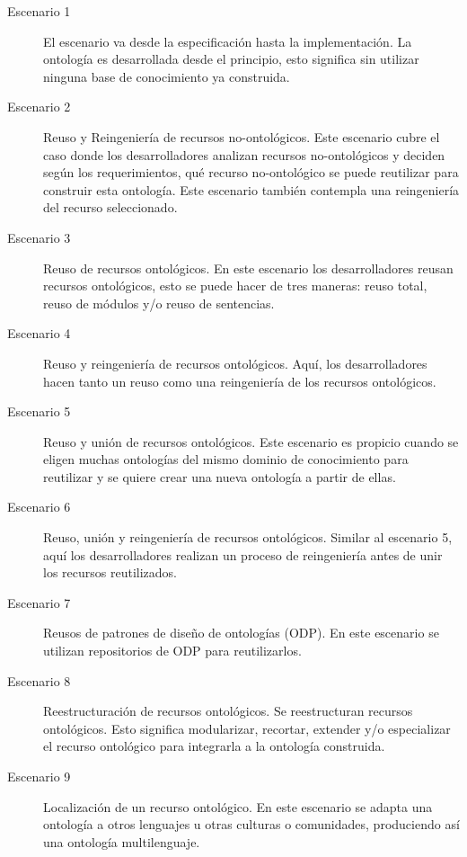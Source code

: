 \begin{description}
    \item[Escenario 1] El escenario va desde la especificación hasta la implementación. La ontología es desarrollada desde el principio, esto significa sin utilizar ninguna base de conocimiento ya construida.
    \item[Escenario 2] Reuso y Reingeniería de recursos no-ontológicos. Este escenario cubre el caso donde los desarrolladores analizan recursos no-ontológicos y deciden según los requerimientos, qué recurso no-ontológico se puede reutilizar para construir esta ontología. Este escenario también contempla una reingeniería del recurso seleccionado.
    \item[Escenario 3] Reuso de recursos ontológicos. En este escenario los desarrolladores reusan recursos ontológicos, esto se puede hacer de tres maneras: reuso total, reuso de módulos y/o reuso de sentencias.
    \item[Escenario 4] Reuso y reingeniería de recursos ontológicos. Aquí, los desarrolladores hacen tanto un reuso como una reingeniería de los recursos ontológicos.
    \item[Escenario 5] Reuso y unión de recursos ontológicos. Este escenario es propicio cuando se eligen muchas ontologías del mismo dominio de conocimiento para reutilizar y se quiere crear una nueva ontología a partir de ellas.
    \item[Escenario 6] Reuso, unión y reingeniería de recursos ontológicos. Similar al escenario 5, aquí los desarrolladores realizan un proceso de reingeniería antes de unir los recursos reutilizados.
    \item[Escenario 7] Reusos de patrones de diseño de ontologías (ODP). En este escenario se utilizan repositorios de ODP para reutilizarlos.
    \item[Escenario 8] Reestructuración de recursos ontológicos. Se reestructuran recursos ontológicos. Esto significa modularizar, recortar, extender y/o especializar el recurso ontológico para integrarla a la ontología construida.
    \item[Escenario 9] Localización de un recurso ontológico. En este escenario se adapta una ontología a otros lenguajes u otras culturas o comunidades, produciendo así una ontología multilenguaje.
\end{description}

